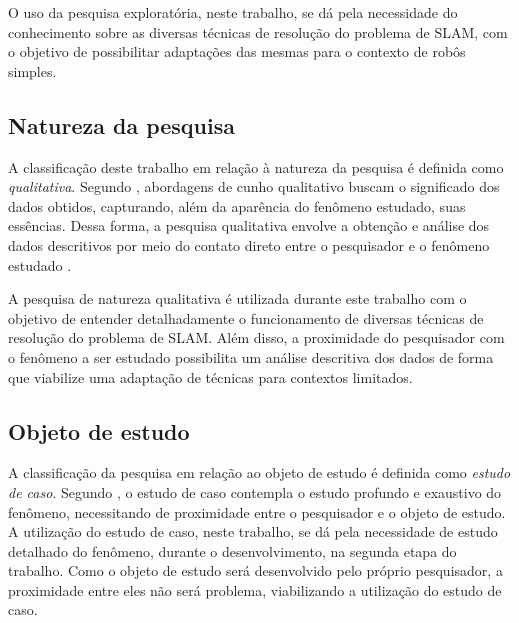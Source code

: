		O uso da pesquisa exploratória, neste trabalho, se dá pela necessidade do conhecimento sobre as diversas técnicas de resolução do problema de SLAM, com o objetivo de possibilitar adaptações das mesmas para o contexto de robôs simples.

	\subsection{Natureza da pesquisa} %
	\label{sec:classificação_quanto_à_natureza_da_pesquisa}
	
		A classificação deste trabalho em relação à natureza da pesquisa é definida como \textit{qualitativa}. Segundo \cite{metodologiaCientifica}, abordagens de cunho qualitativo buscam o significado dos dados obtidos, capturando, além da aparência do fenômeno estudado, suas essências. Dessa forma, a pesquisa qualitativa envolve a obtenção e análise dos dados descritivos por meio do contato direto entre o pesquisador e o fenômeno estudado \cite{metodologiaCientifica}. 

		A pesquisa de natureza qualitativa é utilizada durante este trabalho com o objetivo de entender detalhadamente o funcionamento de diversas técnicas de resolução do problema de SLAM. Além disso, a proximidade do pesquisador com o fenômeno a ser estudado possibilita um análise descritiva dos dados de forma que viabilize uma adaptação de técnicas para contextos limitados. 

	\subsection{Objeto de estudo} %
	\label{sec:classificação_quanto_à_escolha_do_objeto_de_estudo}
	
		A classificação da pesquisa em relação ao objeto de estudo é definida como \textit{estudo de caso}. Segundo \cite{metodologiaCientifica}, o estudo de caso contempla o estudo profundo e exaustivo do fenômeno, necessitando de proximidade entre o pesquisador e o objeto de estudo. A utilização do estudo de caso, neste trabalho, se dá pela necessidade de estudo detalhado do fenômeno, durante o desenvolvimento, na segunda etapa do trabalho. Como o objeto de estudo será desenvolvido pelo próprio pesquisador, a proximidade entre eles não será problema, viabilizando a utilização do estudo de caso.

